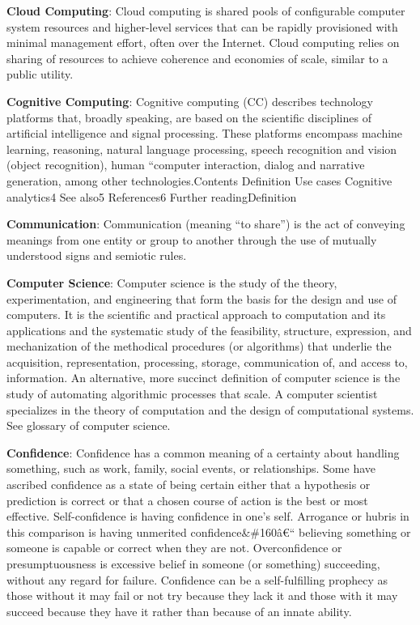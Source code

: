 \documentclass[b5paper,]{book}
\newcommand{\euro}{€}
\theoremstyle{definition}
\theoremstyle{definition}
\theoremstyle{definition}
\theoremstyle{remark}
\begin{document}
\textbf{Cloud Computing}: Cloud computing is shared pools of
configurable computer system resources and higher-level services that
can be rapidly provisioned with minimal management effort, often over
the Internet. Cloud computing relies on sharing of resources to achieve
coherence and economies of scale, similar to a public utility.

\textbf{Cognitive Computing}: Cognitive computing (CC) describes
technology platforms that, broadly speaking, are based on the scientific
disciplines of artificial intelligence and signal processing. These
platforms encompass machine learning, reasoning, natural language
processing, speech recognition and vision (object recognition), human
``computer interaction, dialog and narrative generation, among other
technologies.Contents Definition Use cases Cognitive analytics4 See
also5 References6 Further readingDefinition

\textbf{Communication}: Communication (meaning ``to share'') is the act
of conveying meanings from one entity or group to another through the
use of mutually understood signs and semiotic rules.

\textbf{Computer Science}: Computer science is the study of the theory,
experimentation, and engineering that form the basis for the design and
use of computers. It is the scientific and practical approach to
computation and its applications and the systematic study of the
feasibility, structure, expression, and mechanization of the methodical
procedures (or algorithms) that underlie the acquisition,
representation, processing, storage, communication of, and access to,
information. An alternative, more succinct definition of computer
science is the study of automating algorithmic processes that scale. A
computer scientist specializes in the theory of computation and the
design of computational systems. See glossary of computer science.

\textbf{Confidence}: Confidence has a common meaning of a certainty
about handling something, such as work, family, social events, or
relationships. Some have ascribed confidence as a state of being certain
either that a hypothesis or prediction is correct or that a chosen
course of action is the best or most effective. Self-confidence is
having confidence in one's self. Arrogance or hubris in this comparison
is having unmerited confidence\&\#160â\euro{}`` believing something or
someone is capable or correct when they are not. Overconfidence or
presumptuousness is excessive belief in someone (or something)
succeeding, without any regard for failure. Confidence can be a
self-fulfilling prophecy as those without it may fail or not try because
they lack it and those with it may succeed because they have it rather
than because of an innate ability.
\end{document}
